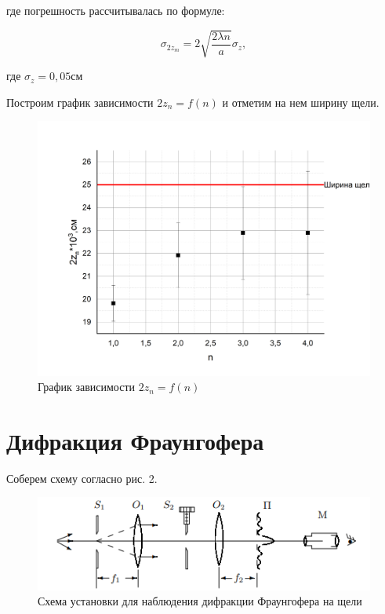 \documentclass[a4paper,12pt]{article}
\begin{document}
где погрешность рассчитывалась по формуле:

$$
\sigma_{2z_m} = 2 \sqrt{\frac{2\lambda n}{a}} \sigma_z,
$$

где $\sigma_z = 0,05 см$

Построим график зависимости $2z_n = f(n)$ и отметим на нем ширину щели.

\begin{figure}[h!]
	\begin{center}
    		\includegraphics[scale = 0.4]{graph1}
    		\caption{График зависимости $2z_n = f(n)$}
	\end{center}
\end{figure}

\section*{Дифракция Фраунгофера}

Соберем схему согласно рис. 2. 

\begin{figure}[h!]
	\begin{center}
    		\includegraphics[scale = 1]{fig2}
    		\caption{Схема установки для наблюдения дифракции Фраунгофера на щели}
	\end{center}
\end{figure}
\end{document}
